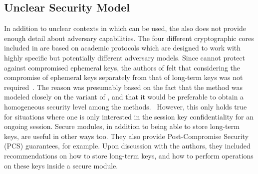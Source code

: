 \documentclass[runningheads]{llncs}
\begin{document}
\subsection{Unclear Security Model}
In addition to unclear contexts in which \mEdhoc{} can be used, the \mSpec{} also does not provide enough detail about adversary capabilities. 
%
The four different cryptographic cores included in \mEdhoc{} are based on academic protocols which are designed to work with highly specific but potentially different adversary models.
%
Since \mSigma{} cannot protect against compromised ephemeral keys, the authors of \mEdhoc{} felt that considering the compromise of ephemeral keys separately from that of long-term keys was not required~\cite{personalCommunication}.
%
The reason was presumably based on the fact that the \mSigSig{} method was modeled closely on the \mSigmaI{} variant of \mSigma{}, and that it would be preferable to obtain a homogeneous security level among the \mEdhoc{}
methods.~\cite{Norr21}
%
However, this only holds true for situations where one is only interested in the session key confidentiality for an ongoing session.
%
Secure modules, in addition to being able to store long-term keys, are useful in other ways too. 
%
They also provide Post-Compromise Security (PCS) guarantees, for example.
%
Upon discussion with the authors, they included recommendations on how to store long-term keys, and how to perform operations on these keys inside a secure module.
\end{document}
